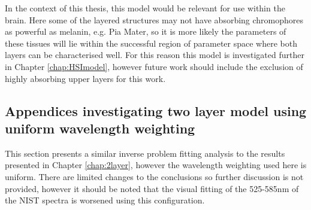 In the context of this thesis, this model would be relevant for use within the brain. Here some of the layered structures may not have absorbing chromophores as powerful as melanin, e.g. Pia Mater, so it is more likely the parameters of these tissues will lie within the successful region of parameter space where both layers can be characterised well. For this reason this model is investigated further in Chapter \ref{chap:HSImodel}, however future work should include the exclusion of highly absorbing upper layers for this work. 

% 
% 

% 

% 
\begin{subappendices}
    \section{Appendices investigating two layer model using uniform wavelength weighting}\label{ap:2layeruniform}
This section presents a similar inverse problem fitting analysis to the results presented in Chapter \ref{chap:2layer}, however the wavelength weighting used here is uniform. There are limited changes to the conclusions so further discussion is not provided, however it should be noted that the visual fitting of the 525-585nm of the NIST spectra is worsened using this configuration.


\end{subappendices}
